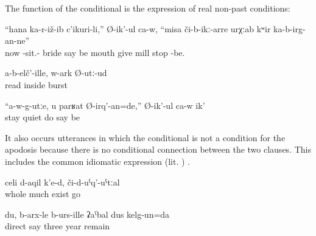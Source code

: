 The function of the conditional is the expression of real non-past conditions: 
%
\begin{exe}
	\ex	\label{ex:‎The bride who just married}
	\gll	``hana	ka-r-iž-ib	c'ikuri-li,''	Ø-ik'-ul	ca-w,	``misa či-b-ikː-arre	urχːab	kʷir	ka-b-irg-an-ne''\\
		now	-sit.-	bride	say	be	mouth	give	mill	stop	-be.\\
	\glt	{}

	\ex	\label{ex:If I do not read (my song), I burst inside.}
	\gll	a-b-elč'-ille,	w-ark	Ø-utː-ud\\
		read	\tsc{m-}inside	burst\\
	\glt	{}

	\ex	\label{ex:‎‎‎If you (= masc.) do not calm down, I make you calm, he says}
	\gll	``a-w-g-utːe,	u	parʁat	Ø-irq'-an=de,''	Ø-ik'-ul	ca-w	ik'\\
		stay		quiet	do	say	be	\\
	\glt	{}
\end{exe}

It also occurs utterances in which the conditional is not a condition for the apodosis because there is no conditional connection between the two clauses. This includes the common idiomatic expression  (lit. ) .
%
\begin{exe}
	\ex	\label{ex:‎‎There is much there (i.e. the graveyard is large), if you go there}
	\gll	celi d-aqil	k'e-d,	či-d-uˁq'-uˁtːal\\
		whole	much	exist		go\\
	\glt	{}

	\ex	\label{ex:I, to be honest, remained for three years.}
	\gll	du,	b-arx-le	b-urs-ille	ʡaˁbal	dus	kelg-un=da\\
			direct	say		three	year	remain\\
	\glt	{}
\end{exe}

